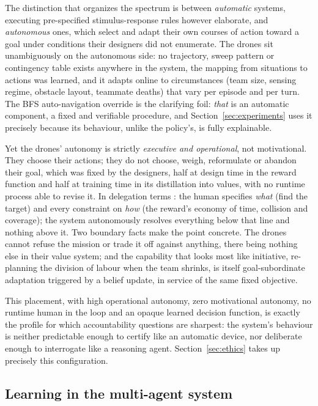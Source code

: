 The distinction that organizes the spectrum is between \emph{automatic} systems,
executing pre-specified stimulus-response rules however elaborate, and
\emph{autonomous} ones, which select and adapt their own courses of action toward
a goal under conditions their designers did not enumerate. The drones sit
unambiguously on the autonomous side: no trajectory, sweep pattern or contingency
table exists anywhere in the system, the mapping from situations to actions was
learned, and it adapts online to circumstances (team size, sensing regime,
obstacle layout, teammate deaths) that vary per episode and per turn. The BFS
auto-navigation override is the clarifying foil: \emph{that} is an automatic
component, a fixed and verifiable procedure, and Section~\ref{sec:experiments}
uses it precisely because its behaviour, unlike the policy's, is fully
explainable.

Yet the drones' autonomy is strictly \emph{executive and operational}, not
motivational. They choose their actions; they do not choose, weigh, reformulate
or abandon their goal, which was fixed by the designers, half at design time in
the reward function and half at training time in its distillation into values,
with no runtime process able to revise it. In delegation terms
\citep{dod2012autonomy}: the human specifies \emph{what} (find the target) and
every constraint on \emph{how} (the reward's economy of time, collision and
coverage); the system autonomously resolves everything below that line and
nothing above it. Two boundary facts make the point concrete. The drones cannot
refuse the mission or trade it off against anything, there being nothing else in
their value system; and the capability that looks most like initiative,
re-planning the division of labour when the team shrinks, is itself
goal-subordinate adaptation triggered by a belief update, in service of the same
fixed objective.

This placement, with high operational autonomy, zero motivational autonomy, no
runtime human in the loop and an opaque learned decision function, is exactly the
profile for which accountability questions are sharpest: the system's behaviour
is neither predictable enough to certify like an automatic device, nor deliberate
enough to interrogate like a reasoning agent. Section~\ref{sec:ethics} takes up
precisely this configuration.

\subsection{Learning in the multi-agent system}
\label{subsec:mas-learning}

